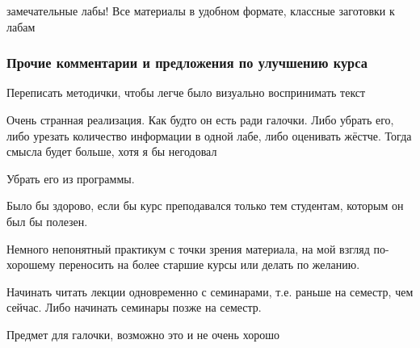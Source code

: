             \begin{commentbox} 
                замечательные лабы! Все материалы в удобном формате, классные заготовки к лабам 
            \end{commentbox} 
    
    \subsubsection{Прочие комментарии и предложения по улучшению курса}
		\begin{commentbox}
			Переписать методички, чтобы легче было визуально воспринимать текст
		\end{commentbox}

        \begin{commentbox}
			Очень странная реализация. Как будто он есть ради галочки. Либо убрать его, либо урезать количество информации в одной лабе, либо оценивать жёстче. Тогда смысла будет больше, хотя я бы негодовал
		\end{commentbox}

        \begin{commentbox}
			Убрать его из программы.
		\end{commentbox}

        \begin{commentbox}
			Было бы здорово, если бы курс преподавался только тем студентам, которым он был бы полезен.
		\end{commentbox}
        
        \begin{commentbox}
			Немного непонятный практикум с точки зрения материала, на мой взгляд по-хорошему переносить на более старшие курсы или делать по желанию.
		\end{commentbox}

        \begin{commentbox}
			Начинать читать лекции одновременно с семинарами, т.е. раньше на семестр, чем сейчас. Либо начинать семинары позже на семестр.
		\end{commentbox}

        \begin{commentbox}
			Предмет для галочки, возможно это и не очень хорошо
		\end{commentbox}